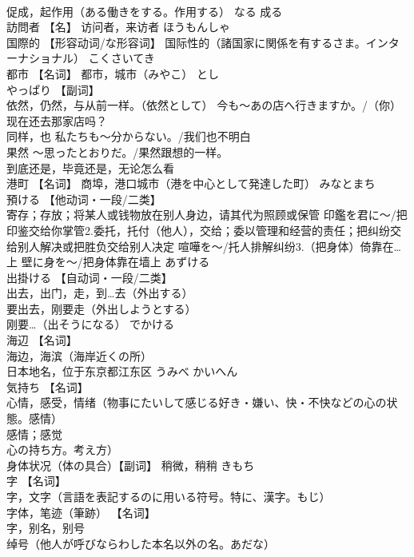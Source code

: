 \documentclass[8pt]{extreport}
\begin{document}
\begin{CJK}{UTF8}{min}
\\	促成，起作用（ある働きをする。作用する）	なる	成る
\\	訪問者	【名】 访问者，来访者	ほうもんしゃ	
\\	国際的	【形容动词/な形容词】 国际性的（諸国家に関係を有するさま。インターナショナル）	こくさいてき	
\\	都市	【名词】 都市，城市（みやこ）	とし	
\\	やっぱり	【副词】 
\\	依然，仍然，与从前一样。（依然として） 今も〜あの店へ行きますか。/（你）现在还去那家店吗？ 
\\	同样，也 私たちも〜分からない。/我们也不明白 
\\	果然 〜思ったとおりだ。/果然跟想的一样。 
\\	到底还是，毕竟还是，无论怎么看		
\\	港町	【名词】 商埠，港口城市（港を中心として発達した町）	みなとまち	
\\	預ける	【他动词・一段/二类】 
\\	寄存；存放；将某人或钱物放在别人身边，请其代为照顾或保管 印鑑を君に～/把印鉴交给你掌管2.委托，托付（他人），交给；委以管理和经营的责任；把纠纷交给别人解决或把胜负交给别人决定 喧嘩を～/托人排解纠纷3.（把身体）倚靠在…上 壁に身を～/把身体靠在墙上	あずける	
\\	出掛ける	【自动词・一段/二类】 
\\	出去，出门，走，到…去（外出する） 
\\	要出去，刚要走（外出しようとする） 
\\	刚要…（出そうになる）	でかける	
\\	海辺	【名词】 
\\	海边，海滨（海岸近くの所） 
\\	日本地名，位于东京都江东区	うみべ かいへん	
\\	気持ち	【名词】 
\\	心情，感受，情绪（物事にたいして感じる好き・嫌い、快・不快などの心の状態。感情） 
\\	感情；感觉
\\	心の持ち方。考え方） 
\\	身体状况（体の具合）【副词】 稍微，稍稍	きもち	
\\	字	【名词】 
\\	字，文字（言語を表記するのに用いる符号。特に、漢字。もじ） 
\\	字体，笔迹（筆跡） 【名词】 
\\	字，别名，别号 
\\	绰号（他人が呼びならわした本名以外の名。あだな） 

\end{CJK}
\end{document}
